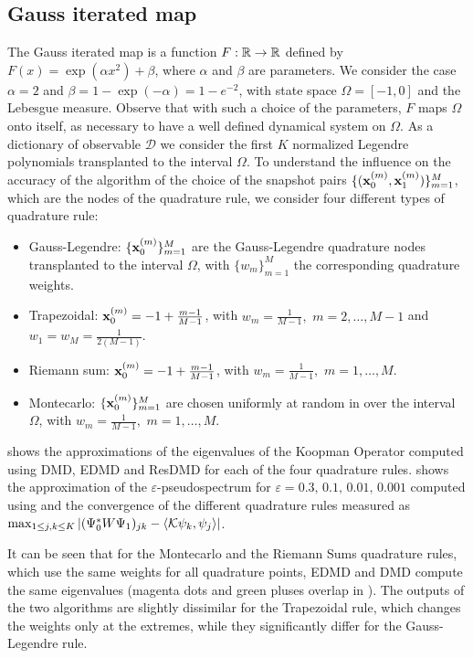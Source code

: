 \subsection{Gauss iterated map}
\label{sect_gauss_iterated_map}
The Gauss iterated map is a function $F:\mathbb{R}\to\mathbb{R}$ defined by $F(x) =\exp(\alpha x^2) + \beta $, where $\alpha$ and $\beta$ are parameters. We consider the case $\alpha = 2$ and $\beta = 1-\exp(-\alpha) = 1 - e^{-2}$, with state space $\Omega = [-1, 0]$ and the Lebesgue measure. Observe that with such a choice of the parameters, $F$ maps $\Omega$ onto itself, as necessary to have a well defined dynamical system on $\Omega$. As a dictionary of observable $\mathcal{D}$ we consider the first $K$ normalized Legendre polynomials transplanted to the interval $\Omega$. To understand the influence on the accuracy of the algorithm of the choice of the snapshot pairs $\{(\vb{x}_0^{(m)}, \vb{x}_1^{(m)})\}_{m = 1}^M$, which are the nodes of the quadrature rule, we consider four different types of quadrature rule:
\begin{itemize}
    \item Gauss-Legendre: $\{\vb{x}_0^{(m)}\}_{m = 1}^M$ are the Gauss-Legendre quadrature nodes transplanted to the interval $\Omega$, with $\{w_m\}_{m = 1}^M$ the corresponding quadrature weights.
    \item Trapezoidal: $\vb{x}_0^{(m)} = -1 + \frac{m-1}{M-1}$, with $w_m = \frac{1}{M-1},\,\,m = 2,\dots, M-1$ and $w_1 = w_M = \frac{1}{2(M-1)}$.
    \item Riemann sum: $\vb{x}_0^{(m)} = -1 + \frac{m-1}{M-1}$, with $w_m = \frac{1}{M-1},\,\,m = 1,\dots, M$.
    \item Montecarlo: $\{\vb{x}_0^{(m)}\}_{m = 1}^M$ are chosen uniformly at random in over the interval $\Omega$, with $w_m = \frac{1}{M-1},\,\,m = 1,\dots, M$. 
\end{itemize}

 shows the approximations of the eigenvalues of the Koopman Operator computed using DMD, EDMD and ResDMD for each of the four quadrature rules.  shows the approximation of the $\varepsilon$-pseudospectrum for $\varepsilon = 0.3,\,0.1,\,0.01,\,0.001$ computed using  and the convergence of the different quadrature rules measured as $\max_{1\leq j,k \leq K} \abs{(\Psi_0^* W \Psi_1)_{jk} - \langle\mathcal{K}\psi_k, \psi_j\rangle}$.

It can be seen that for the Montecarlo and the Riemann Sums quadrature rules, which use the same weights for all quadrature points, EDMD and DMD compute the same eigenvalues (magenta dots and green pluses overlap in ). The outputs of the two algorithms are slightly dissimilar for the Trapezoidal rule, which changes the weights only at the extremes, while they significantly differ for the Gauss-Legendre rule.

